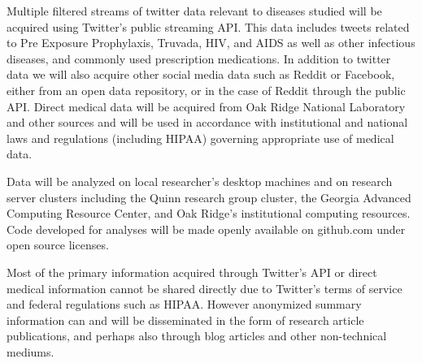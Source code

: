 
Multiple filtered streams of twitter data relevant to diseases studied will be acquired using Twitter's public streaming API. This data includes tweets related to Pre Exposure Prophylaxis, Truvada, HIV, and AIDS as well as other infectious diseases, and commonly used prescription medications. In addition to twitter data we will also acquire other social media data such as Reddit or Facebook, either from an open data repository, or in the case of Reddit through the public API. Direct medical data will be acquired from Oak Ridge National Laboratory and other sources and will be used in accordance with institutional and national laws and regulations (including HIPAA) governing appropriate use of medical data.

Data will be analyzed on local researcher's desktop machines and on research server clusters including the Quinn research group cluster, the Georgia Advanced Computing Resource Center, and Oak Ridge's institutional computing resources. Code developed for analyses will be made openly available on github.com under open source licenses.

Most of the primary information acquired through Twitter's API or direct medical information cannot be shared directly due to Twitter's terms of service and federal regulations such as HIPAA. However anonymized summary information can and will be disseminated in the form of research article publications, and perhaps also through blog articles and other non-technical mediums.